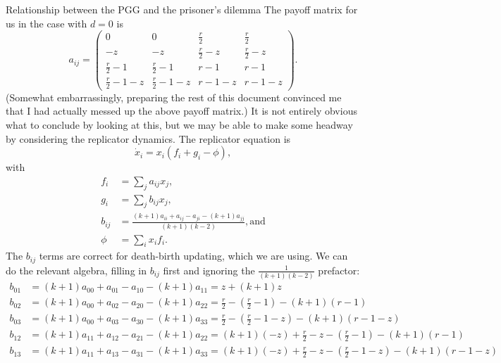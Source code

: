 \documentclass[13pt]{amsart}
\begin{document}
\begin{section}{Relationship between the PGG and the prisoner's dilemma}
The payoff matrix for us in the case with $d = 0$ is
\begin{equation}
    a_{ij} =
        \begin{pmatrix}
        0 & 0 & \frac{r}{2} & \frac{r}{2} \\
        -z & -z & \frac{r}{2} - z & \frac{r}{2} - z \\
        \frac{r}{2} - 1 & \frac{r}{2} - 1 & r - 1 & r - 1 \\
        \frac{r}{2} - 1 - z & \frac{r}{2} - 1 - z  & r - 1 - z & r - 1 - z
    \end{pmatrix}.
\end{equation}
(Somewhat embarrassingly, preparing the rest of this document convinced me that I had actually messed up the above payoff matrix.)
It is not entirely obvious what to conclude by looking at this, but we may be able to make some headway by considering the replicator dynamics.
The replicator equation is
\begin{equation}
    \dot{x}_i = x_i (f_i + g_i - \phi),
\end{equation}
with
\begin{equation}
    \begin{split}
        f_i & = \sum_j a_{ij} x_j,\\
        g_i & = \sum_j b_{ij} x_j,\\
        b_{ij} & = \frac{(k+1)a_{ii} + a_{ij} - a_{ji} - (k+1)a_{jj}}{(k+1)(k-2)}, \text{and}\\
        \phi & = \sum_i x_i f_i.
    \end{split}
\end{equation}
The $b_{ij}$ terms are correct for death-birth updating, which we are using.
We can do the relevant algebra, filling in $b_{ij}$ first and ignoring the $\frac{1}{(k+1)(k-2)}$ prefactor:
\begin{equation}
    \begin{split}
        b_{01} & = (k+1)a_{00} + a_{01} - a_{10} - (k+1)a_{11} = z + (k+1)z \\
        b_{02} & = (k+1)a_{00} + a_{02} - a_{20} - (k+1)a_{22} = \frac{r}{2} - (\frac{r}{2} - 1) - (k+1)(r-1)\\
        b_{03} & = (k+1)a_{00} + a_{03} - a_{30} - (k+1)a_{33} = \frac{r}{2} - (\frac{r}{2} - 1 - z) - (k+1)(r - 1 - z) \\
        b_{12} & = (k+1)a_{11} + a_{12} - a_{21} - (k+1)a_{22} = (k+1)(-z) + \frac{r}{2} - z - (\frac{r}{2} - 1) - (k+1)(r-1)\\
        b_{13} & = (k+1)a_{11} + a_{13} - a_{31} - (k+1)a_{33} = (k+1)(-z) + \frac{r}{2} - z - (\frac{r}{2} - 1 - z) - (k+1)(r - 1 - z)\\

\end{split}
\end{equation}
\end{section}
\end{document}
